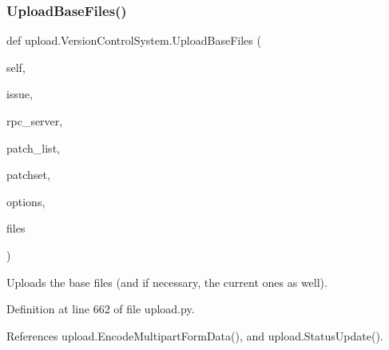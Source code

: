 \subsubsection{\texorpdfstring{Upload\+Base\+Files()}{UploadBaseFiles()}\hspace{0.1cm}{\footnotesize\ttfamily [1/2]}}
{\footnotesize\ttfamily def upload.\+Version\+Control\+System.\+Upload\+Base\+Files (\begin{DoxyParamCaption}\item[{}]{self,  }\item[{}]{issue,  }\item[{}]{rpc\+\_\+server,  }\item[{}]{patch\+\_\+list,  }\item[{}]{patchset,  }\item[{}]{options,  }\item[{}]{files }\end{DoxyParamCaption})}

\begin{DoxyVerb}Uploads the base files (and if necessary, the current ones as well).\end{DoxyVerb}
 

Definition at line 662 of file upload.\+py.



References upload.\+Encode\+Multipart\+Form\+Data(), and upload.\+Status\+Update().


